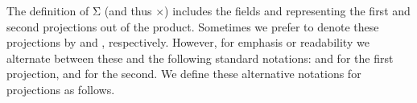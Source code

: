 The definition of \ar Σ (and thus \af ×) includes the fields   and  representing the first and second projections out of the product.  Sometimes we prefer to denote these projections by  and , respectively. However, for emphasis or readability we alternate between these and the following standard notations:  and  for the first projection,  and  for the second.  We define these alternative notations for projections as follows.
\ccpad
\begin{code}%
\>[0]\AgdaSpace{}%
\AgdaModule{\AgdaUnderscore{}}\AgdaSpace{}%
\AgdaSymbol{\{}\AgdaSpace{}%
\AgdaSymbol{:}\AgdaSpace{}%
\AgdaSymbol{\}}\AgdaSpace{}%
\<%
\\
%
\\[\AgdaEmptyExtraSkip]%
\>[0][@{}l@{\AgdaIndent{0}}]%
\>[1]\AgdaSpace{}%
\AgdaSpace{}%
\AgdaSymbol{:}\AgdaSpace{}%
\AgdaSymbol{\{}\AgdaSpace{}%
\AgdaSymbol{:}\AgdaSpace{}%
\AgdaSpace{}%
\AgdaSpace{}%
\AgdaSymbol{\}\{}\AgdaSpace{}%
\AgdaSymbol{:}\AgdaSpace{}%
\AgdaSpace{}%
\AgdaSpace{}%
\AgdaSpace{}%
\AgdaSymbol{\}}\AgdaSpace{}%
\AgdaSpace{}%
\AgdaSpace{}%
\AgdaSpace{}%
\AgdaSpace{}%
\<%
\\
%
\>[1]\AgdaSpace{}%
\AgdaSpace{}%
\AgdaOperator{\AgdaInductiveConstructor{,}}\AgdaSpace{}%
\AgdaSpace{}%
\AgdaSpace{}%
\AgdaSymbol{=}\AgdaSpace{}%
\<%
\\
%
\>[1]\AgdaSpace{}%
\AgdaSymbol{(}\AgdaSpace{}%
\AgdaOperator{\AgdaInductiveConstructor{,}}\AgdaSpace{}%
\AgdaSymbol{)}\AgdaSpace{}%
\AgdaSymbol{=}\AgdaSpace{}%
\<%
\\
%
\\[\AgdaEmptyExtraSkip]%
%
\>[1]\AgdaSpace{}%

\end{code}

